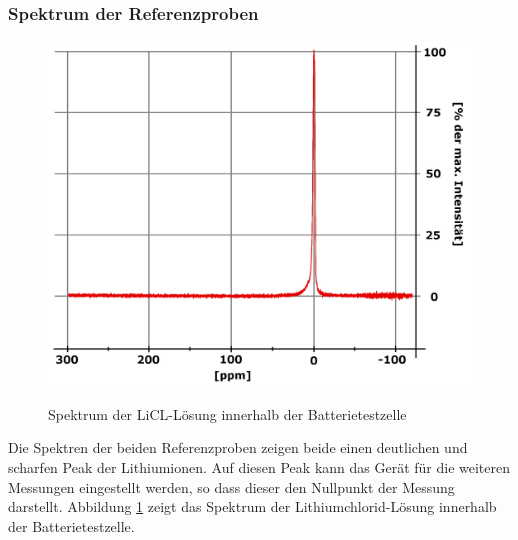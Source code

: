 \documentclass[a4paper, 11pt, headsepline,footsepline,twoside,abstract]{scrbook}
\begin{document}
\subsubsection{Spektrum der Referenzproben}
\begin{figure}
	\centering
	\includegraphics[width=0.75\columnwidth]{images/LiCl_Batterie.jpg}
	\label{LiCl_Batterie_NMR} 
	\caption{Spektrum der LiCL-Lösung innerhalb der Batterietestzelle}
	\label{LiCl_Batterie_NMR}
\end{figure} 
Die Spektren der beiden Referenzproben zeigen beide einen deutlichen und scharfen Peak der Lithiumionen. Auf diesen Peak kann das Gerät für die weiteren Messungen eingestellt werden, so dass dieser den Nullpunkt der Messung darstellt. Abbildung \ref{LiCl_Batterie_NMR} zeigt das Spektrum der Lithiumchlorid-Lösung innerhalb der Batterietestzelle.
\end{document}
